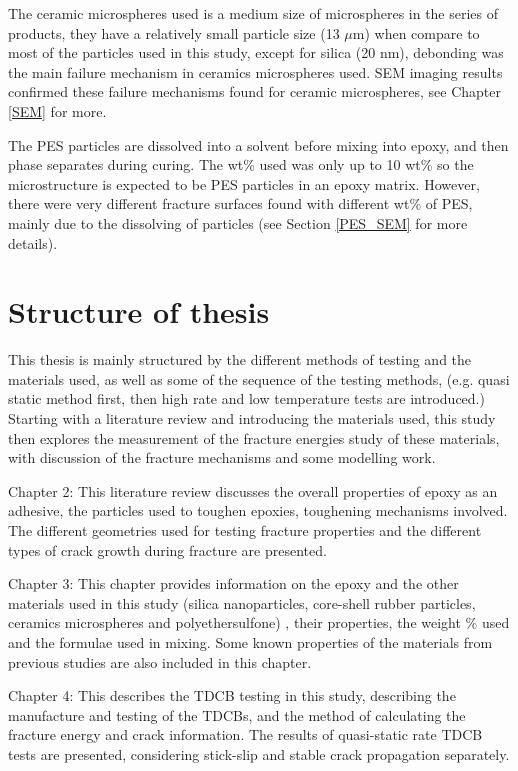 \documentclass[numbers=noendperiod,chapterprefix=on]{icldt} %
\begin{document}
The ceramic microspheres used is a medium size of microspheres in the series of products, they have a relatively small particle size (13 $ \mu $m) when compare to most of the particles used in this study, except for silica (20 nm), debonding was the main failure mechanism in ceramics microspheres used. SEM imaging results confirmed these failure mechanisms found for ceramic microspheres, see Chapter \ref{SEM} for more. 

The PES particles are dissolved into a solvent before mixing into epoxy, and then phase separates during curing. 
The wt\% used was only up to 10 wt\% so the microstructure is expected to be PES particles in an epoxy matrix.
However, there were very different fracture surfaces found with different wt\% of PES, mainly due to the dissolving of particles (see Section \ref{PES_SEM} for more details). 

\section{Structure of thesis} 
This thesis is mainly structured by the different methods of testing and the materials used, as well as some of the sequence of the testing methods, (e.g. quasi static method first, then high rate and low temperature tests are introduced.) Starting 
with a literature review and introducing the materials used, this study then explores the measurement of the fracture energies study of these materials, with discussion of the fracture mechanisms and some modelling work.
 

Chapter 2: This literature review discusses the overall properties of epoxy as an adhesive, the particles used to toughen epoxies, toughening mechanisms involved. The different geometries used for testing fracture properties and the different types of crack growth during fracture are presented.

Chapter 3: This chapter provides information on the epoxy and the other materials used in this study 
(silica nanoparticles, core-shell rubber particles, ceramics microspheres and polyethersulfone)
, their properties, the weight \% used and the formulae used in mixing. Some known properties of the materials from previous studies are also included in this chapter.

Chapter 4: This describes the TDCB testing in this study, describing the manufacture and testing of the TDCBs, and the method of calculating the fracture energy and crack information. The results of quasi-static rate TDCB tests are presented, considering stick-slip and stable crack propagation separately. 
\end{document}
